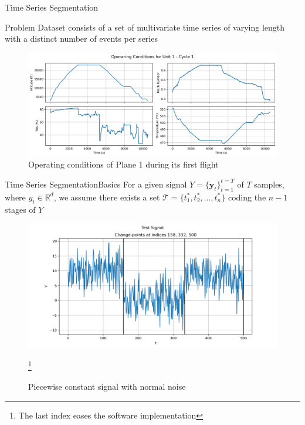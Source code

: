 \documentclass{beamer}
\begin{document}
            \begin{frame}{Time Series Segmentation}

                \begin{alertblock}{Problem}
                    Dataset consists of a set of multivariate time series of varying length with a distinct number of events per series
                \end{alertblock}
                \begin{figure}[!htbp]
                    \centering
                    \includegraphics[scale=0.3]{operating_conditions_unit_1_cycle_1.png}
                    \caption{Operating conditions of Plane 1 during its first flight}
                \end{figure}

            \end{frame}

            \begin{frame}{Time Series Segmentation}{Basics}
                For a given signal $Y = \{\boldsymbol{y}_t\}_{t=1}^{t=T}$ of $T$ samples, where $y_t \in \mathbb{R}^d$, we assume there exists a set $\mathcal{T} = \{t_{1}^{*}, t_{2}^{*}, \dots, t_{n}^{*}\}$ coding the $n-1$ stages of $Y$

                \begin{figure}[!htbp]
                    \centering
                    \includegraphics[scale=0.35]{show_series.png}
                    \caption{Piecewise constant signal with normal noise}
                    \footnote{The last index eases the software implementation}
                \end{figure}
            \end{frame}
\end{document}
